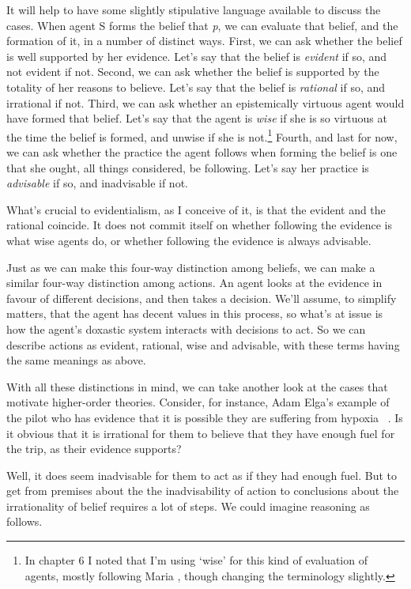It will help to have some slightly stipulative language available to discuss the cases. When agent S forms the belief that \emph{p}, we can evaluate that belief, and the formation of it, in a number of distinct ways. First, we can ask whether the belief is well supported by her evidence. Let's say that the belief is \emph{evident} if so, and not evident if not. Second, we can ask whether the belief is supported by the totality of her reasons to believe. Let's say that the belief is \emph{rational} if so, and irrational if not. Third, we can ask whether an epistemically virtuous agent would have formed that belief. Let's say that the agent is \emph{wise} if she is so virtuous at the time the belief is formed, and unwise if she is not.\footnote{In chapter 6 I noted that I'm using `wise' for this kind of evaluation of agents, mostly following Maria \citet{Lasonen-Aarnio2010b, Lasonen-Aarnio2014}, though changing the terminology slightly.} Fourth, and last for now, we can ask whether the practice the agent follows when forming the belief is one that she ought, all things considered, be following. Let's say her practice is \emph{advisable} if so, and inadvisable if not.

What's crucial to evidentialism, as I conceive of it, is that the evident and the rational coincide. It does not commit itself on whether following the evidence is what wise agents do, or whether following the evidence is always advisable.

Just as we can make this four-way distinction among beliefs, we can make a similar four-way distinction among actions. An agent looks at the evidence in favour of different decisions, and then takes a decision. We'll assume, to simplify matters, that the agent has decent values in this process, so what's at issue is how the agent's doxastic system interacts with decisions to act. So we can describe actions as evident, rational, wise and advisable, with these terms having the same meanings as above.

With all these distinctions in mind, we can take another look at the cases that motivate higher-order theories. Consider, for instance, Adam Elga's example of the pilot who has evidence that it is possible they are suffering from hypoxia ~\citep{Elga2008}. Is it obvious that it is irrational for them to believe that they have enough fuel for the trip, as their evidence supports?

Well, it does seem inadvisable for them to act as if they had enough fuel. But to get from premises about the the inadvisability of action to conclusions about the irrationality of belief requires a lot of steps. We could imagine reasoning as follows.

